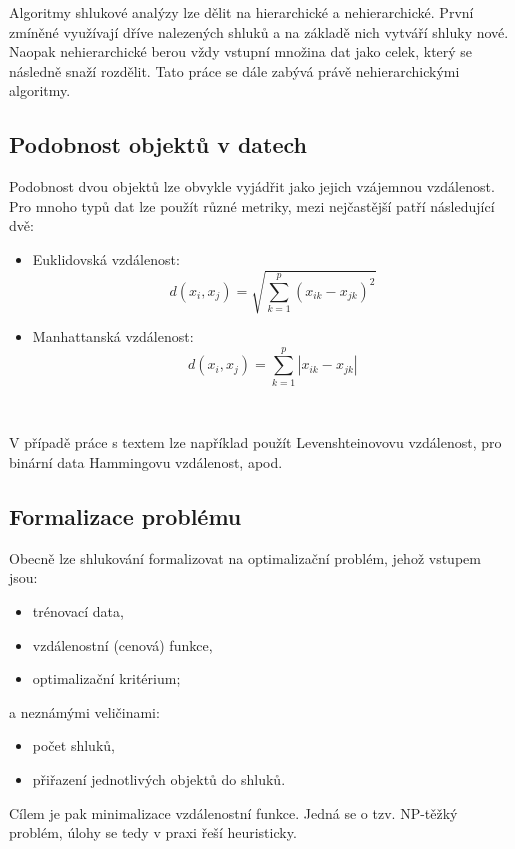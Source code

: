 \documentclass[pdftex,a4paper]{article}
\begin{document}
Algoritmy shlukové analýzy lze dělit na hierarchické a nehierarchické. První zmíněné využívají dříve nalezených shluků a na základě nich vytváří shluky nové. Naopak nehierarchické berou vždy vstupní množina dat jako celek, který se následně snaží rozdělit. Tato práce se dále zabývá právě nehierarchickými algoritmy.



\subsection{Podobnost objektů v datech}

Podobnost dvou objektů lze obvykle vyjádřit jako jejich vzájemnou vzdálenost. Pro mnoho typů dat lze použít různé metriky, mezi nejčastější patří následující dvě:

\begin{itemize}
	\item Euklidovská vzdálenost: \[d(x_i,x_j) = \sqrt{\sum_{k=1}^p (x_{ik}-x_{jk})^2}\]
	\item Manhattanská vzdálenost: \[d(x_i,x_j) = \sum_{k=1}^p \left| x_{ik}-x_{jk} \right|\]
\end{itemize}~

V případě práce s textem lze například použít Levenshteinovovu vzdálenost, pro binární data Hammingovu vzdálenost, apod.



\subsection{Formalizace problému}

Obecně lze shlukování formalizovat na optimalizační problém, jehož vstupem jsou:
\begin{itemize}
	\item trénovací data,
	\item vzdálenostní (cenová) funkce,
	\item optimalizační kritérium;
\end{itemize}
a neznámými veličinami:
\begin{itemize}
	\item počet shluků,
	\item přiřazení jednotlivých objektů do shluků.
\end{itemize}

Cílem je pak minimalizace vzdálenostní funkce. Jedná se o tzv. NP-těžký problém, úlohy se tedy v praxi řeší heuristicky.
\end{document}
